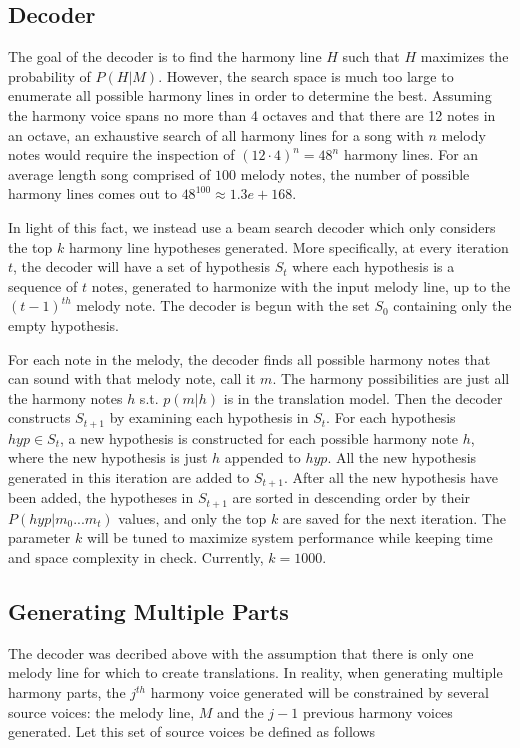 \documentclass{sig-alternate}
\begin{document}
\subsection {Decoder}
The goal of the decoder is to find the harmony line $H$ such that $H$ maximizes the probability of $P(H | M)$. However, the search space is much too large to enumerate all possible harmony lines in order to determine the best. Assuming the harmony voice spans no more than 4 octaves and that there are 12 notes in an octave, an exhaustive search of all harmony lines for a song with $n$ melody notes would require the inspection of $(12\cdot 4)^{n} = 48^{n}$ harmony lines. For an average length song comprised of $100$ melody notes, the number of possible harmony lines comes out to $48^{100} \approx 1.3e+168$. 

In light of this fact, we instead use a beam search decoder which only considers the top $k$ harmony line hypotheses generated. More specifically, at every iteration $t$, the decoder will have a set of hypothesis $S_{t}$ where each hypothesis is a sequence of $t$ notes, generated to harmonize with the input melody line, up to the $(t - 1)^{th}$ melody note. The decoder is begun with the set $S_{0}$ containing only the empty hypothesis. 

For each note in the melody, the decoder finds all possible harmony notes that can sound with that melody note, call it $m$. The harmony possibilities are just all the harmony notes $h$ s.t. $p(m | h)$ is in the translation model. Then the decoder constructs $S_{t + 1}$ by examining each hypothesis in $S_{t}$. For each hypothesis $hyp \in S_{t}$, a new hypothesis is constructed for each possible harmony note $h$, where the new hypothesis is just $h$ appended to $hyp$. All the new hypothesis generated in this iteration are added to $S_{t + 1}$. After all the new hypothesis have been added, the hypotheses in $S_{t + 1}$ are sorted in descending order by their $P(hyp | m_{0} ... m_{t})$ values, and only the top $k$ are saved for the next iteration.
The parameter $k$ will be tuned to maximize system performance while keeping time and space complexity in check. Currently, $k = 1000$.

\subsection {Generating Multiple Parts}
The decoder was decribed above with the assumption that there is only one melody line for  which to create translations. In reality, when generating multiple harmony parts, the $j^{th}$ harmony voice generated will be constrained by several source voices: the melody line, $M$ and the $j-1$ previous harmony voices generated. Let this set of source voices be defined as follows\\
\end{document}
